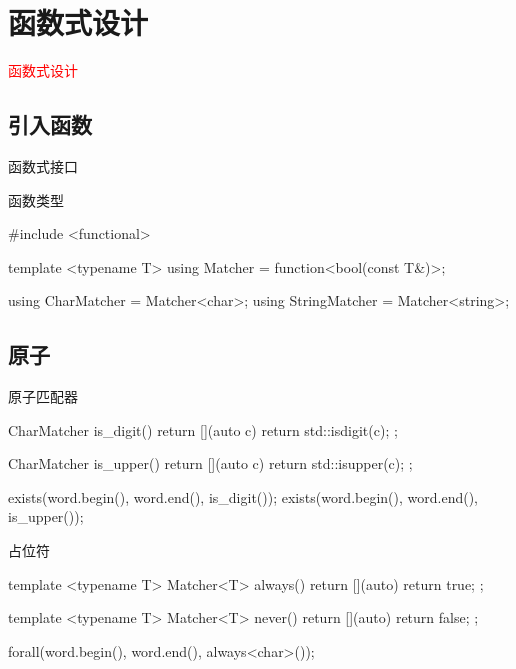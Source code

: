 \section{函数式设计}
\label{sec:fpdesign}

\begin{frame}
  \begin{center}
    \Huge{\textcolor{red}{函数式设计}}
  \end{center}
\end{frame}

\subsection{引入函数}

\begin{frame}[fragile]{函数式接口}
 \begin{block}{函数类型}
  \begin{c++}
#include <functional>

template <typename T>
using Matcher = function<bool(const T&)>;

using CharMatcher   = Matcher<char>;
using StringMatcher = Matcher<string>;
  \end{c++}
 \end{block}
\end{frame}

\subsection{原子}

\begin{frame}[fragile]{原子匹配器}
  \begin{c++}
  CharMatcher is_digit() {
    return [](auto c) { 
      return std::isdigit(c); 
    };
  }

  CharMatcher is_upper() {
    return [](auto c) { 
      return std::isupper(c); 
    };
  }

  exists(word.begin(), word.end(), is_digit());
  exists(word.begin(), word.end(), is_upper());
  \end{c++}
\end{frame}  

\begin{frame}[fragile]{占位符}
  \begin{c++}
  template <typename T>
  Matcher<T> always() {
    return [](auto) {
      return true;
    };
  }

  template <typename T>
  Matcher<T> never() {
    return [](auto) {
      return false;
    };
  }

  forall(word.begin(), word.end(), always<char>());  
  \end{c++}
\end{frame}

